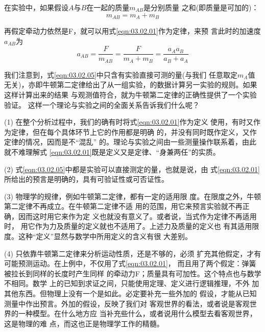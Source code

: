 在实验中，如果假设$ A $与$ B $在一起的质量$ m_{AB} $是分别质量
之和(即质量是可加的)：
\begin{equation}\label{eqn:03.02.04}
    m _ { A B } = m _ { A } + m _ { B }
\end{equation}

再假定牵动力依然是F，就可以用式\eqref{eqn:03.02.01}作为定律，来预
言此时的加速度$ a_{AB} $为
\begin{equation}\label{eqn:03.02.05}
    a _ { A B } = \frac { F } { m _ { A B } } = \frac { F } { m _ { A } + m _ { B } } = \frac { a _ { A } a _ { B } } { a _ { B } + a _ { A } }
\end{equation}

{我们注意到，式\eqref{eqn:03.02.05}中只含有实验直接可测的量(与我们
任意取定$ m_A $值无关)，亦即牛顿第二定律给出了从一组实验\lhbrak {}，\rhbrak 的数据计算另一实验\lhbrak {}\rhbrak 的规则。如果这样计算出来的结果
与观测值符合，就为牛顿第二定律的正确性提供了一个实验验证。
这样一个理论与实验之间的全面关系告诉我们什么呢？}

(1) 在整个分析过程中，我们的确有时将式\eqref{eqn:03.02.01}作为定义
使用，有时又作为定律，但在每个具体环节上它的作用都是明确
的，并没有同时既作定义，又作定律的情况，因而是不“混乱”
的。理论与实验之间由一些测量操作联系着，由此就不难理解式
\eqref{eqn:03.02.01}既是定义又是定律、“身兼两任”的实质。

(2) 式\eqref{eqn:03.02.05}中都是实验可以直接测定的量，也就是说，由
式\eqref{eqn:03.02.01}所给出的预言是明确的，具有可验证性或可否证性。

(3) 物理学的规律，例如牛顿第二定律，都有一定的适用限
度。在限度之外，牛顿第二定律不再成立。在牛顿第二定律不适
用的范围，用它来预言实验就不再正确，因而这时用它来作为定
义也就没有意义了。或者说，当式作为定律不再适用时，
用它作为力及质量的定义就也不适用了。上述力及质量的定义也
有其适用限度。这种“定义”显然与数学中所用定义的含义有很
大差别。

(4) 只依靠牛顿第二定律来分析运动性质，还是不够的，必须
扩充其他假定，才有可能预测运动。在上例中，不仅用了式\eqref{eqn:03.02.01}，
而且用了两个假定：弹簧被拉长到同样的长度时产生同样
的牵动力F；质量具有可加性。这个特点也与数学不相同。数学
上的已知到求证之间，只能使用定理、定义进行逻辑推理，不外
加其他东西。但物理上没有一个是如此。必定要补充一些外加的
假设，才能从已知测量中作出预言。外加的假设，反映了我们对
客观世界的看法，或者说是客观世界的一种模型。在什么地方应
当补充些什么，或者说用什么模型去看客观世界，这是物理的难
点，而这也正是物理学工作的精髓。

